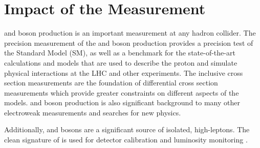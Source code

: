 \section{Impact of the Measurement}
\W and \Z boson production is an important measurement at any hadron collider. The precision measurement of the \W and \Z boson production provides a precision test of the Standard Model (SM), as well as a benchmark for the state-of-the-art calculations and models that are used to describe the proton and simulate physical interactions at the LHC and other experiments. The inclusive cross section measurements are the foundation of differential cross section measurements which provide greater constraints on different aspects of the models.  \W and \Z boson production is also significant background to many other electroweak measurements and searches for new physics.

Additionally, \W and \Z bosons are a significant source of isolated, high-\pt leptons. The clean signature of \zll is used for detector calibration and luminosity monitoring \cite{xinmei}.
